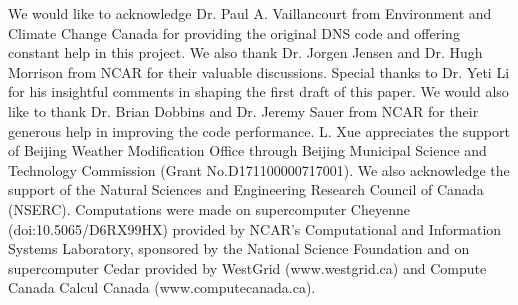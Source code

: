 \acknowledgments
We would like to acknowledge Dr. Paul A. Vaillancourt from Environment and Climate Change Canada for providing the original DNS code and offering constant help in this project. We also thank Dr. Jorgen Jensen and Dr. Hugh Morrison from NCAR for their valuable discussions. Special thanks to Dr. Yeti Li for his insightful comments in shaping the first draft of this paper. We would also like to thank Dr. Brian Dobbins and Dr. Jeremy Sauer from NCAR for their generous help in improving the code performance. L. Xue appreciates the support of Beijing Weather Modification Office through Beijing Municipal Science and Technology Commission (Grant No.D171100000717001). We also acknowledge the support of the Natural Sciences and Engineering Research Council of Canada (NSERC). Computations were made on supercomputer Cheyenne (doi:10.5065/D6RX99HX) provided by NCAR's Computational and Information Systems Laboratory, sponsored by the National Science Foundation and on supercomputer Cedar provided by WestGrid (www.westgrid.ca) and Compute Canada Calcul Canada (www.computecanada.ca).

\cleardoublepage 
